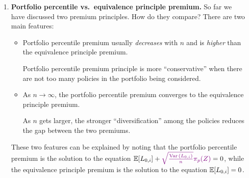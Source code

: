 \begin{enumerate}
\item \label{it:port-percen-vs-equiv} \textbf{Portfolio percentile vs.\
equivalence principle premium.} So far we have discussed two premium
principles. How do they compare? There are two main features:
\begin{itemize}
\item Portfolio percentile premium usually \emph{decreases} with \(n\) and is
\emph{higher} than the equivalence principle premium. \begin{intuition}
Portfolio percentile premium principle is more ``conservative'' when there are
not too many policies in the portfolio being considered.  \end{intuition}
\item As \(n\to\infty\), the portfolio percentile premium converges to the
equivalence principle premium. \begin{intuition}
As \(n\) gets larger, the stronger ``diversification'' among the policies
reduces the gap between the two premiums.
\end{intuition}
\end{itemize}
These two features can be explained by noting that the portfolio percentile
premium is the solution to the equation \(
\mathbb{E}\qty[L_{0,i}]+{\color{violet}\sqrt{\frac{\operatorname{Var}\qty(L_{0,i})}{n}}\pi_{p}(Z)}=0 \), while the
equivalence principle premium is the solution to the equation
\(\mathbb{E}\qty[L_{0,i}]=0\).
\end{enumerate}
